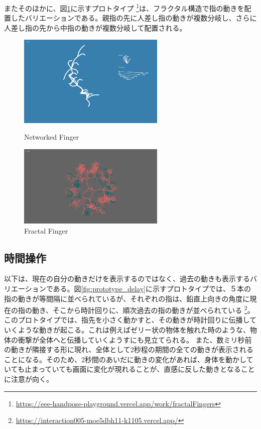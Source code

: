 またそのほかに、図\ref{fig:fractal_finger}に示すプロトタイプ \footnote{\url{https://eee-handpose-playground.vercel.app/work/fractalFingers}}は、フラクタル構造で指の動きを配置したバリエーションである。親指の先に人差し指の動きが複数分岐し、さらに人差し指の先から中指の動きが複数分岐して配置される。

\begin{figure}[htbp]
  \begin{minipage}[b]{0.5\linewidth}
    \centering
    \includegraphics[keepaspectratio, width=7cm]{img/networked_finger.png}
    \caption{Networked Finger}
    \label{fig:networked_finger}
  \end{minipage}
  \begin{minipage}[b]{0.5\linewidth}
    \centering
    \includegraphics[keepaspectratio, width=7cm]{img/fractel_finger.png}
    \caption{Fractal Finger}
    \label{fig:fractal_finger}
  \end{minipage}
\end{figure}

\subsection{時間操作}
以下は、現在の自分の動きだけを表示するのではなく、過去の動きも表示するバリエーションである。図\ref{fig:prototype_delay}に示すプロトタイプでは、５本の指の動きが等間隔に並べられているが、それぞれの指は、鉛直上向きの角度に現在の指の動き、そこから時計回りに、順次過去の指の動きが並べられている \footnote{\url{https://interaction005-moe5dbh11-k1105.vercel.app/}}。このプロトタイプでは、指先を小さく動かすと、その動きが時計回りに伝播していくような動きが起こる。これは例えばゼリー状の物体を触れた時のような、物体の衝撃が全体へと伝播していくようすにも見立てられる。
また、数ミリ秒前の動きが隣接する形に現れ、全体として2秒程の期間の全ての動きが表示されることになる。そのため、2秒間のあいだに動きの変化があれば、身体を動かしていても止まっていても画面に変化が現れることが、直感に反した動きとなることに注意が向く。

